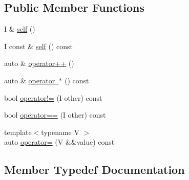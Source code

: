 \subsection*{Public Member Functions}
\begin{DoxyCompactItemize}
\item 
I \& \mbox{\hyperlink{structrah_1_1iterator__facade_3_01_i_00_01_r_00_01std_01_1_1output__iterator__tag_01_4_abe7859e4020df003875751114b067114}{self}} ()
\item 
I const  \& \mbox{\hyperlink{structrah_1_1iterator__facade_3_01_i_00_01_r_00_01std_01_1_1output__iterator__tag_01_4_a7241639571b436388ac1ccf4131b4ae2}{self}} () const
\item 
auto \& \mbox{\hyperlink{structrah_1_1iterator__facade_3_01_i_00_01_r_00_01std_01_1_1output__iterator__tag_01_4_a659213116532c917e96dafe69a5785fe}{operator++}} ()
\item 
auto \& \mbox{\hyperlink{structrah_1_1iterator__facade_3_01_i_00_01_r_00_01std_01_1_1output__iterator__tag_01_4_a7131cdd8b9cd56660a11021e4f9708b0}{operator $\ast$}} () const
\item 
bool \mbox{\hyperlink{structrah_1_1iterator__facade_3_01_i_00_01_r_00_01std_01_1_1output__iterator__tag_01_4_a72c1751a7267f5627a8bd21569a7e147}{operator!=}} (I other) const
\item 
bool \mbox{\hyperlink{structrah_1_1iterator__facade_3_01_i_00_01_r_00_01std_01_1_1output__iterator__tag_01_4_a41db7b320b25b73268ff256590fe306c}{operator==}} (I other) const
\item 
{\footnotesize template$<$typename V $>$ }\\auto \mbox{\hyperlink{structrah_1_1iterator__facade_3_01_i_00_01_r_00_01std_01_1_1output__iterator__tag_01_4_a0f85444e5a2d769ccffae7a6dce9a70d}{operator=}} (V \&\&value) const
\end{DoxyCompactItemize}


\subsection{Member Typedef Documentation}
\mbox{\label{structrah_1_1iterator__facade_3_01_i_00_01_r_00_01std_01_1_1output__iterator__tag_01_4_a3564661cd457ec25b43c0f7a831d1224}} 
